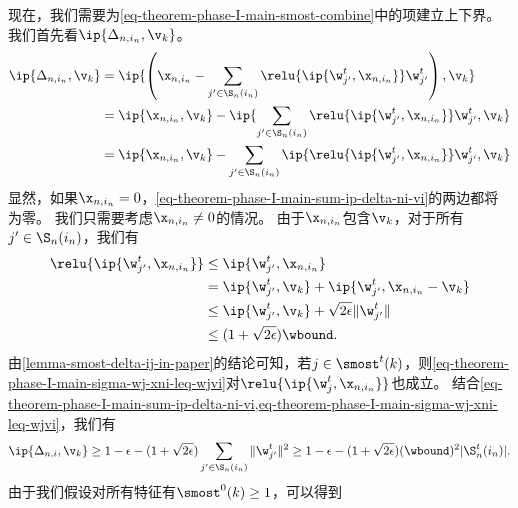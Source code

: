 \begin{myproof}
现在，我们需要为\cref{eq-theorem-phase-I-main-smost-combine}中的项建立上下界。
我们首先看$\ip{\Delta_{n,i_n},\v_k} $。
\begin{equation}\label{eq-theorem-phase-I-main-sum-ip-delta-ni-vi}
\begin{aligned}
    \ip{\Delta_{n,i_n},\v_k} 
    &= \ip{ \left(\x_{n,i_n} - \sum_{{j^{\prime}} \in \S_{n}(i_n)} \relu{\ip{\w_{j^{\prime}}^{t},\x_{n,i_n}}  } \w_{j^{\prime}}^{t} \right), \v_k } \\
    &= \ip{ \x_{n,i_n}, \v_k } - \ip{ \sum_{{j^{\prime}} \in \S_{n}(i_n)} \relu{\ip{\w_{j^{\prime}}^{t},\x_{n,i_n}}  } \w_{j^{\prime}}^{t}, \v_k } \\
    &= \ip{ \x_{n,i_n}, \v_k } -  \sum_{{j^{\prime}} \in \S_{n}(i_n)} \ip{  \relu{\ip{\w_{j^{\prime}}^{t},\x_{n,i_n}}  } \w_{j^{\prime}}^{t}, \v_k }
\end{aligned}
\end{equation}
显然，如果$\x_{n,i_n} = 0$，\cref{eq-theorem-phase-I-main-sum-ip-delta-ni-vi}的两边都将为零。
我们只需要考虑$\x_{n,i_n} \neq 0$的情况。
由于$\x_{n,i_n}$包含$\v_k$，对于所有$ j^{\prime} \in \S_{n}(i_n) $，我们有 
\begin{equation}\label{eq-theorem-phase-I-main-sigma-wj-xni-leq-wjvi}
\begin{aligned}
    \relu{\ip{\w_{j^{\prime}}^{t},\x_{n,i_n}}  } &\leq \ip{\w_{j^{\prime}}^{t},\x_{n,i_n}}   \\
    &= \ip{\w_{j^{\prime}}^{t}, \v_k} + \ip{\w_{j^{\prime}}^{t},\x_{n,i_n} - \v_k }   \\
    &\leq \ip{\w_{j^{\prime}}^{t}, \v_k} + \sqrt{2\epsilon} \|\w_{j^{\prime}}^t\|   \\ %
    &\leq (1 + \sqrt{2\epsilon}) \wbound.
\end{aligned}
\end{equation}
由\cref{lemma-smost-delta-ij-in-paper}的结论可知，若$j \in \smost^t(k)$，则\cref{eq-theorem-phase-I-main-sigma-wj-xni-leq-wjvi}对$\relu{\ip{\w_j^{t},\x_{n,i_n}}}$也成立。
结合\cref{eq-theorem-phase-I-main-sum-ip-delta-ni-vi,eq-theorem-phase-I-main-sigma-wj-xni-leq-wjvi}，我们有
\begin{equation}
    \ip{\Delta_{n,i},\v_k} 
    \geq 1 - \epsilon 
    - (1 + \sqrt{2\epsilon})\sum_{{j^{\prime}} \in \S_{n}(i_n)} \|\w_{j^{\prime}}^{t}\|^2
    \geq 1 - \epsilon - (1 + \sqrt{2 \epsilon})(\wbound)^2|\S^t_n(i_n)|.
\end{equation}
由于我们假设对所有特征有$\smost^{0}(k) \geq 1$，可以得到

\end{myproof}
